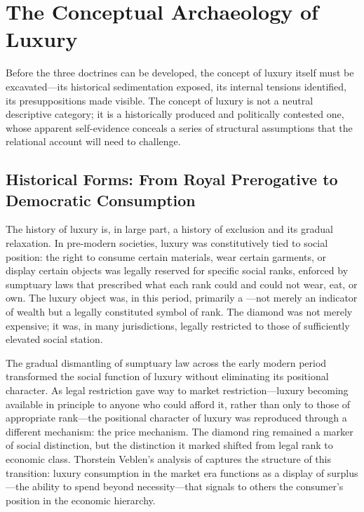 \section{The Conceptual Archaeology of Luxury}
\label{p16:sec:archaeology}

\noindent
Before the three doctrines can be developed, the concept of luxury itself must be excavated---its historical sedimentation exposed, its internal tensions identified, its presuppositions made visible. The concept of luxury is not a neutral descriptive category; it is a historically produced and politically contested one, whose apparent self-evidence conceals a series of structural assumptions that the relational account will need to challenge.

\subsection{Historical Forms: From Royal Prerogative to Democratic Consumption}
\label{p16:subsec:history}

\noindent
The history of luxury is, in large part, a history of exclusion and its gradual relaxation. In pre-modern societies, luxury was constitutively tied to social position: the right to consume certain materials, wear certain garments, or display certain objects was legally reserved for specific social ranks, enforced by sumptuary laws that prescribed what each rank could and could not wear, eat, or own. The luxury object was, in this period, primarily a ---not merely an indicator of wealth but a legally constituted symbol of rank. The diamond was not merely expensive; it was, in many jurisdictions, legally restricted to those of sufficiently elevated social station.

The gradual dismantling of sumptuary law across the early modern period transformed the social function of luxury without eliminating its positional character. As legal restriction gave way to market restriction---luxury becoming available in principle to anyone who could afford it, rather than only to those of appropriate rank---the positional character of luxury was reproduced through a different mechanism: the price mechanism. The diamond ring remained a marker of social distinction, but the distinction it marked shifted from legal rank to economic class. Thorstein Veblen's analysis of  \parencite{veblen1899} captures the structure of this transition: luxury consumption in the market era functions as a display of surplus---the ability to spend beyond necessity---that signals to others the consumer's position in the economic hierarchy.

